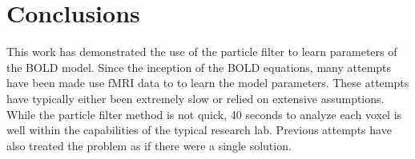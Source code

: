 

\section{Conclusions}
\label{sec:Conclusion}
This work has demonstrated the use of the particle filter to
learn parameters of the \ac{BOLD} model. Since the inception of the
\ac{BOLD} equations, many attempts have been made use \ac{fMRI} data to
to learn the model parameters. These attempts have typically either been extremely
slow or relied on extensive assumptions. While the particle filter method
is not quick, 40 seconds to analyze each voxel is well within the capabilities
of the typical research lab. Previous attempts have also treated
the problem as if there were a single solution.

